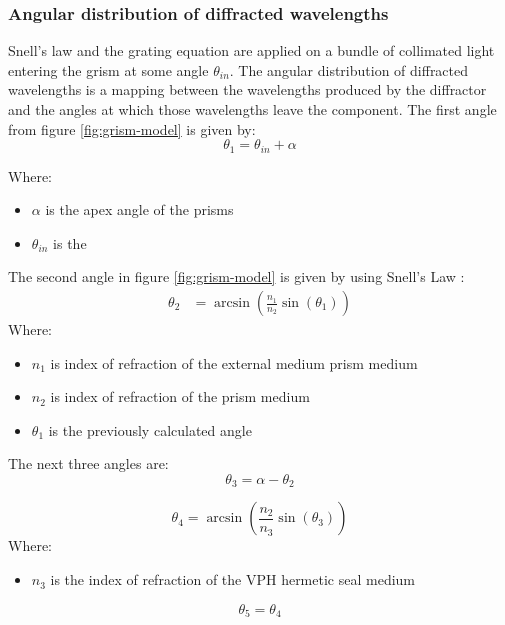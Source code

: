 \documentclass{article}
\begin{document}
\subsubsection{Angular distribution of diffracted wavelengths}
Snell's law and the grating equation are applied on a bundle of collimated light entering the grism at some angle $\theta_{in}$. The angular distribution of diffracted wavelengths is a mapping between the wavelengths produced by the diffractor and the angles at which those wavelengths leave the component. The first angle from figure \ref{fig:grism-model} is given by:
\begin{equation}
\theta_1 = \theta_{in} + \alpha
\end{equation}

Where:
\begin{itemize}[label={}]
    \item $\alpha$ is the apex angle of the prisms
    \item $\theta_{in}$ is the 
\end{itemize}
The second angle in figure \ref{fig:grism-model} is given by using Snell's Law \cite{Wikipedia_contributors_undated-ti}:
\begin{align} 
\theta_2 &= \arcsin\left( \frac{n_1}{n_2} \sin\left( \theta_1 \right) \right) 
\end{align} 
Where:
\begin{itemize}[label={}]
    \item $n_1$ is index of refraction of the external medium prism medium
    \item $n_2$ is index of refraction of the prism medium
    \item $\theta_1$ is the previously calculated angle
\end{itemize}

The next three angles are:
\begin{equation}
\theta_3 = \alpha - \theta_2
\end{equation}

\begin{equation}
\theta_4 = \arcsin\left( \frac{n_2}{n_3} \sin\left( \theta_3 \right) \right) 
\end{equation}
Where:
\begin{itemize}[label={}]
    \item $n_3$ is the index of refraction of the VPH hermetic seal medium
\end{itemize}

\begin{equation}
\theta_5 = \theta_4
\end{equation}
\end{document}
